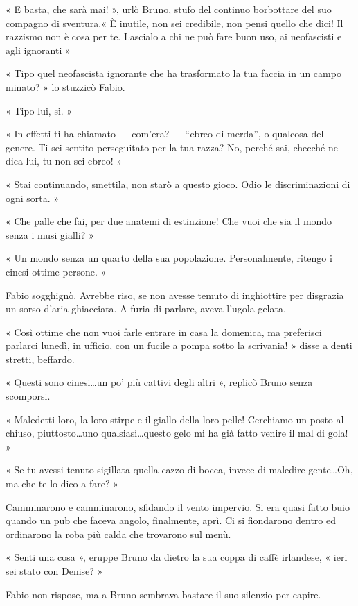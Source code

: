 « E basta, che sarà mai! », urlò Bruno, stufo del continuo borbottare del suo compagno di sventura.« È inutile, non sei credibile, non pensi quello che dici! Il razzismo non è cosa per te. Lascialo a chi ne può fare buon uso, ai neofascisti e agli ignoranti »

« Tipo quel neofascista ignorante che ha trasformato la tua faccia in un campo minato? » lo stuzzicò Fabio.

« Tipo lui, sì. »

« In effetti ti ha chiamato --- com'era? --- ``ebreo di merda'', o qualcosa del genere. Ti sei sentito perseguitato per la tua razza? No, perché sai, checché ne dica lui, tu non sei ebreo! »

« Stai continuando, smettila, non starò a questo gioco. Odio le discriminazioni di ogni sorta. »

« Che palle che fai, per due anatemi di estinzione! Che vuoi che sia il mondo senza i musi gialli? »

« Un mondo senza un quarto della sua popolazione. Personalmente, ritengo i cinesi ottime persone. »

Fabio sogghignò. Avrebbe riso, se non avesse temuto di inghiottire per disgrazia un sorso d'aria ghiacciata. A furia di parlare, aveva l'ugola gelata.

« Così ottime che non vuoi farle entrare in casa la domenica, ma preferisci parlarci lunedì, in ufficio, con un fucile a pompa sotto la scrivania! » disse a denti stretti, beffardo.

« Questi sono cinesi\ldots un po' più cattivi degli altri », replicò Bruno senza scomporsi.

« Maledetti loro, la loro stirpe e il giallo della loro pelle! Cerchiamo un posto al chiuso, piuttosto\ldots uno qualsiasi\ldots questo gelo mi ha già fatto venire il mal di gola! »

« Se tu avessi tenuto sigillata quella cazzo di bocca, invece di maledire gente\ldots Oh, ma che te lo dico a fare? »

Camminarono e camminarono, sfidando il vento impervio. Si era quasi fatto buio quando un pub che faceva angolo, finalmente, aprì. Ci si fiondarono dentro ed ordinarono la roba più calda che trovarono sul menù.

« Senti una cosa », eruppe Bruno da dietro la sua coppa di caffè irlandese, « ieri sei stato con Denise? »

Fabio non rispose, ma a Bruno sembrava bastare il suo silenzio per capire.

